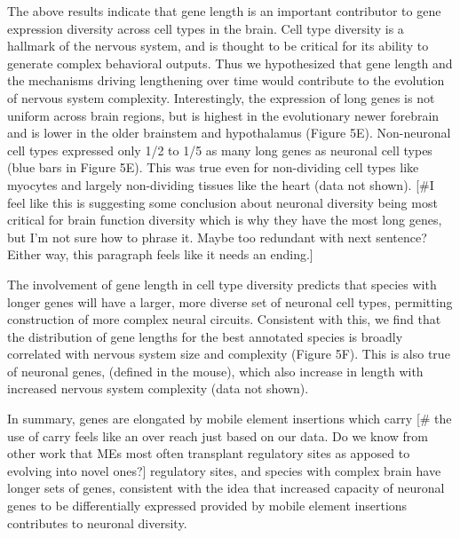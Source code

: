 The above results indicate that gene length is an important contributor to gene expression diversity across cell types in the brain. Cell type diversity is a hallmark of the nervous system, and is thought to be critical for its ability to generate complex behavioral outputs. Thus we hypothesized that gene length and the mechanisms driving lengthening over time would contribute to the evolution of nervous system complexity. Interestingly, the expression of long genes is not uniform across brain regions, but is highest in the evolutionary newer forebrain and is lower in the older brainstem and hypothalamus (Figure 5E). Non-neuronal cell types expressed only 1/2 to 1/5 as many long genes as neuronal cell types (blue bars in Figure 5E). This was true even for non-dividing cell types like myocytes and largely non-dividing tissues like the heart (data not shown). [#I feel like this is suggesting some conclusion about neuronal diversity being most critical for brain function diversity which is why they have the most long genes, but I'm not sure how to phrase it. Maybe too redundant with next sentence? Either way, this paragraph feels like it needs an ending.]

The involvement of gene length in cell type diversity predicts that species with longer genes will have a larger, more diverse set of neuronal cell types, permitting construction of more complex neural circuits. Consistent with this, we find that the distribution of gene lengths for the best annotated species is broadly correlated with nervous system size and complexity (Figure 5F). This is also true of neuronal genes, (defined in the mouse), which also increase in length with increased nervous system complexity (data not shown). 

In summary, genes are elongated by mobile element insertions which carry [# the use of carry feels like an over reach just based on our data. Do we know from other work that MEs most often transplant regulatory sites as apposed to evolving into novel ones?] regulatory sites, and species with complex brain have longer sets of genes, consistent with the idea that increased capacity of neuronal genes to be differentially expressed provided by mobile element insertions contributes to neuronal diversity.




